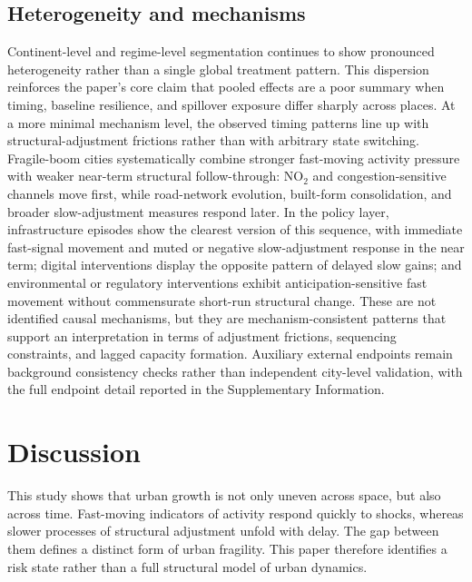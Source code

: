 \documentclass[oneside,pdflatex,sn-nature]{sn-jnl}
\begin{document}
\subsection{Heterogeneity and mechanisms}
Continent-level and regime-level segmentation continues to show pronounced heterogeneity rather than a single global treatment pattern. This dispersion reinforces the paper's core claim that pooled effects are a poor summary when timing, baseline resilience, and spillover exposure differ sharply across places.
At a more minimal mechanism level, the observed timing patterns line up with structural-adjustment frictions rather than with arbitrary state switching. Fragile-boom cities systematically combine stronger fast-moving activity pressure with weaker near-term structural follow-through: NO$_2$ and congestion-sensitive channels move first, while road-network evolution, built-form consolidation, and broader slow-adjustment measures respond later. In the policy layer, infrastructure episodes show the clearest version of this sequence, with immediate fast-signal movement and muted or negative slow-adjustment response in the near term; digital interventions display the opposite pattern of delayed slow gains; and environmental or regulatory interventions exhibit anticipation-sensitive fast movement without commensurate short-run structural change. These are not identified causal mechanisms, but they are mechanism-consistent patterns that support an interpretation in terms of adjustment frictions, sequencing constraints, and lagged capacity formation.
Auxiliary external endpoints remain background consistency checks rather than independent city-level validation, with the full endpoint detail reported in the Supplementary Information.

\section{Discussion}
\label{sec:robustness}

This study shows that urban growth is not only uneven across space, but also across time. Fast-moving indicators of activity respond quickly to shocks, whereas slower processes of structural adjustment unfold with delay. The gap between them defines a distinct form of urban fragility. This paper therefore identifies a risk state rather than a full structural model of urban dynamics.
\end{document}
